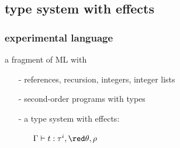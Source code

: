 \subsection*{type system with effects}
\begin{frame}[fragile]
\frametitle{experimental language}
a fragment of ML with
\begin{itemize}
	\item[-] references, recursion, integers, integer lists
	\item[-] {\red second-order} programs with types \\[0.5em]
		\begin{itemize}	
		\end{itemize}
		 \pause
	\item[-] a type system {\red with effects}:\\[0.5em]
		\begin{itemize}
			\item[] \qquad $\Gamma \vdash t: \tau^{i}, {\red \theta, \rho} $
		\end{itemize}
\end{itemize}
\end{frame}


